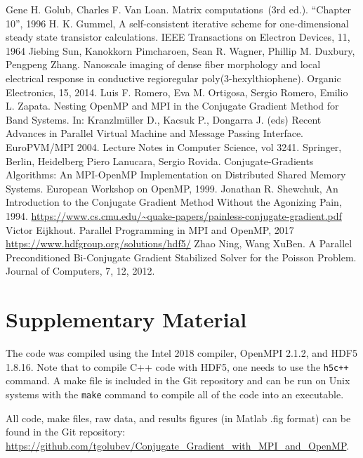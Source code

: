 \documentclass{article}
\begin{document}
\begin{thebibliography}{4}
	 Gene H. Golub,  Charles F. Van Loan. Matrix computations (3rd ed.). “Chapter 10”, 1996
	 H. K. Gummel, A self-consistent iterative scheme for one-dimensional steady state transistor calculations. IEEE Transactions on Electron Devices, 11, 1964
	 Jiebing Sun, Kanokkorn Pimcharoen, Sean R. Wagner, Phillip M. Duxbury, Pengpeng Zhang. Nanoscale imaging of dense fiber morphology and local electrical response in conductive regioregular poly(3-hexylthiophene). Organic Electronics, 15, 2014.
	 Luis F. Romero, Eva M. Ortigosa, Sergio Romero, Emilio L. Zapata. Nesting OpenMP and MPI in the Conjugate Gradient Method for Band Systems. In: Kranzlmüller D., Kacsuk P., Dongarra J. (eds) Recent Advances in Parallel Virtual Machine and Message Passing Interface. EuroPVM/MPI 2004. Lecture Notes in Computer Science, vol 3241. Springer, Berlin, Heidelberg
	 Piero Lanucara, Sergio Rovida. Conjugate-Gradients Algorithms: An MPI-OpenMP Implementation on Distributed Shared Memory Systems. European Workshop on OpenMP, 1999.
	 Jonathan R. Shewchuk, An Introduction to the Conjugate Gradient Method Without the Agonizing Pain, 1994. \url{https://www.cs.cmu.edu/~quake-papers/painless-conjugate-gradient.pdf}
	 Victor Eijkhout. Parallel Programming in MPI and OpenMP, 2017
	 \url{https://www.hdfgroup.org/solutions/hdf5/}
	 Zhao Ning, Wang XuBen. A Parallel Preconditioned Bi-Conjugate Gradient Stabilized Solver for the Poisson Problem. Journal of Computers, 7, 12, 2012.
\end{thebibliography}



\section*{Supplementary Material}   %
The code was compiled using the Intel 2018 compiler, OpenMPI 2.1.2, and HDF5 1.8.16. Note that to compile C++ code with HDF5, one needs to use the \texttt{h5c++} command. A make file is included in the Git repository and can be run on Unix systems with the \texttt{make} command to compile all of the code into an executable.

All code, make files, raw data, and results figures (in Matlab .fig format) can be found in the Git repository: 
\url{https://github.com/tgolubev/Conjugate_Gradient_with_MPI_and_OpenMP}.
\end{document}
